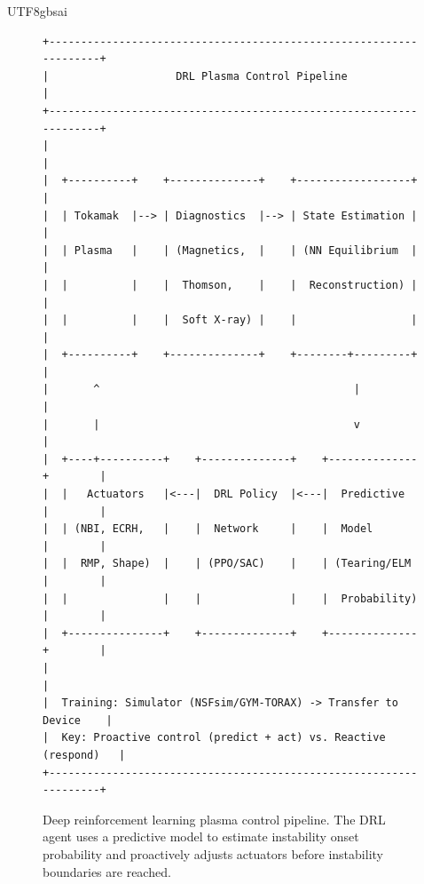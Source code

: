\documentclass[12pt,a4paper]{article}
\begin{document}
\begin{CJK}{UTF8}{gbsai}
\begin{figure}[htbp]
\centering
\small
\begin{verbatim}
+-------------------------------------------------------------------+
|                    DRL Plasma Control Pipeline                     |
+-------------------------------------------------------------------+
|                                                                   |
|  +----------+    +--------------+    +------------------+        |
|  | Tokamak  |--> | Diagnostics  |--> | State Estimation |        |
|  | Plasma   |    | (Magnetics,  |    | (NN Equilibrium  |        |
|  |          |    |  Thomson,    |    |  Reconstruction) |        |
|  |          |    |  Soft X-ray) |    |                  |        |
|  +----------+    +--------------+    +--------+---------+        |
|       ^                                        |                  |
|       |                                        v                  |
|  +----+----------+    +--------------+    +--------------+        |
|  |   Actuators   |<---|  DRL Policy  |<---|  Predictive  |        |
|  | (NBI, ECRH,   |    |  Network     |    |  Model       |        |
|  |  RMP, Shape)  |    | (PPO/SAC)    |    | (Tearing/ELM |        |
|  |               |    |              |    |  Probability) |        |
|  +---------------+    +--------------+    +--------------+        |
|                                                                   |
|  Training: Simulator (NSFsim/GYM-TORAX) -> Transfer to Device    |
|  Key: Proactive control (predict + act) vs. Reactive (respond)   |
+-------------------------------------------------------------------+
\end{verbatim}
\caption{Deep reinforcement learning plasma control pipeline. The DRL agent uses a predictive model to estimate instability onset probability and proactively adjusts actuators before instability boundaries are reached.}
\label{fig:drl-pipeline}
\end{figure}


\end{CJK}
\end{document}
